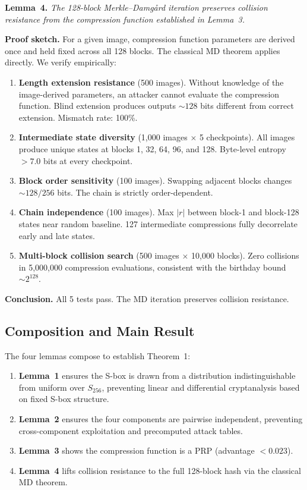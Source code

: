 \documentclass[preprint]{iacrtrans}
\begin{document}
\textbf{Lemma~4.} \emph{The 128-block Merkle--Damg{\aa}rd iteration preserves collision resistance from the compression function established in Lemma~3.}

\textbf{Proof sketch.} For a given image, compression function parameters are derived once and held fixed across all 128 blocks. The classical MD theorem applies directly. We verify empirically:

\begin{enumerate}
    \item \textbf{Length extension resistance} (500 images). Without knowledge of the image-derived parameters, an attacker cannot evaluate the compression function. Blind extension produces outputs ${\sim}128$ bits different from correct extension. Mismatch rate: 100\%.

    \item \textbf{Intermediate state diversity} (1{,}000 images $\times$ 5 checkpoints). All images produce unique states at blocks 1, 32, 64, 96, and 128. Byte-level entropy $> 7.0$ bits at every checkpoint.

    \item \textbf{Block order sensitivity} (100 images). Swapping adjacent blocks changes ${\sim}128/256$ bits. The chain is strictly order-dependent.

    \item \textbf{Chain independence} (100 images). Max $|r|$ between block-1 and block-128 states near random baseline. 127 intermediate compressions fully decorrelate early and late states.

    \item \textbf{Multi-block collision search} (500 images $\times$ 10{,}000 blocks). Zero collisions in 5{,}000{,}000 compression evaluations, consistent with the birthday bound ${\sim}2^{128}$.
\end{enumerate}

\textbf{Conclusion.} All 5 tests pass. The MD iteration preserves collision resistance.

\subsection{Composition and Main Result}

The four lemmas compose to establish Theorem~1:

\begin{enumerate}
    \item \textbf{Lemma~1} ensures the S-box is drawn from a distribution indistinguishable from uniform over $S_{256}$, preventing linear and differential cryptanalysis based on fixed S-box structure.
    \item \textbf{Lemma~2} ensures the four components are pairwise independent, preventing cross-component exploitation and precomputed attack tables.
    \item \textbf{Lemma~3} shows the compression function is a PRP (advantage $< 0.023$).
    \item \textbf{Lemma~4} lifts collision resistance to the full 128-block hash via the classical MD theorem.
\end{enumerate}
\end{document}
